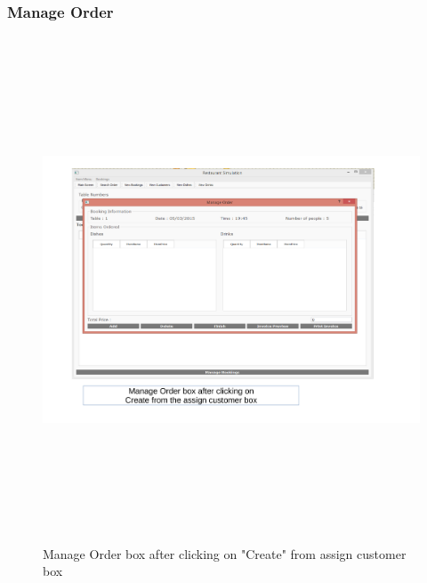 \begin{landscape}
\subsubsection{Manage Order}
\begin{figure}[H]
    \includegraphics[height = 15cm]{./Maintenance/images/screen10}
    \caption{Manage Order box after clicking on "Create" from assign customer box} \label{fig:screen10}
\end{figure}


\end{landscape}
